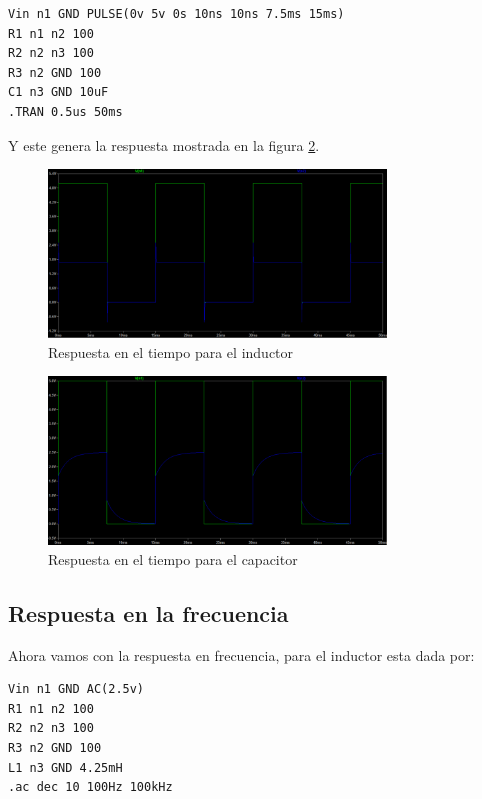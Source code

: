 \documentclass[letterpaper,spanish,12pt]{report}
\begin{document}
\begin{verbatim}
Vin n1 GND PULSE(0v 5v 0s 10ns 10ns 7.5ms 15ms)
R1 n1 n2 100
R2 n2 n3 100
R3 n2 GND 100
C1 n3 GND 10uF
.TRAN 0.5us 50ms
\end{verbatim}

Y este genera la respuesta mostrada en la figura \ref{cir:9}.

\begin{figure}[h]
	\centering
		\includegraphics[width=0.80\textwidth]{ResTieL.eps}
	\caption{Respuesta en el tiempo para el inductor}
	\label{cir:8}
\end{figure}

\begin{figure}[h]
	\centering
		\includegraphics[width=0.80\textwidth]{ResTieC.eps}
	\caption{Respuesta en el tiempo para el capacitor}
	\label{cir:9}
\end{figure}

	\subsection{Respuesta en la frecuencia}

Ahora vamos con la respuesta en frecuencia, para el inductor esta dada por:

\begin{verbatim}
Vin n1 GND AC(2.5v)
R1 n1 n2 100
R2 n2 n3 100
R3 n2 GND 100
L1 n3 GND 4.25mH
.ac dec 10 100Hz 100kHz
\end{verbatim}
\end{document}
